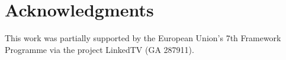 \documentclass{llncs}
\begin{document}

\section*{Acknowledgments}
This work was partially supported by the European Union's 7th Framework Programme via the project LinkedTV (GA 287911).



\end{document}
